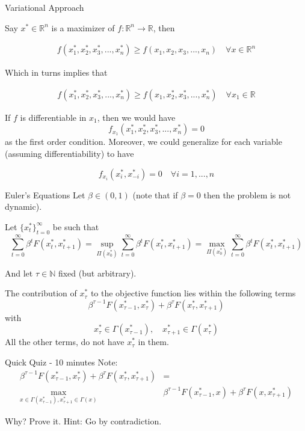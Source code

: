 \documentclass[aspectratio=169]{beamer}
\begin{document}
\begin{frame}{Variational Approach}
    
    Say $x^*\in\mathds{R}^n$ is a maximizer of $f:\mathds{R}^n \rightarrow \mathds{R}$, then
    
        \begin{align*}
            f(x_1^*,x_2^*,x_3^*,...,x_n^*)\geq f(x_1,x_2,x_3,..., x_n)\quad\forall x\in\mathds{R}^n
        \end{align*}
    
    Which in turns implies that
    
    \begin{align*}
            f(x_1^*,x_2^*,x_3^*,...,x_n^*)\geq f(x_1,x_2^*,x_3^*,...,x_n^*)\quad\forall x_1\in\mathds{R}
        \end{align*}
    
    If $f$ is differentiable in $x_1$, then we would have $$f_{x_1}(x_1^*,x_2^*,x_3^*,...,x_n^*) = 0$$ as the first order condition. Moreover, we could generalize for each variable (assuming differentiability) to have
    
    $$f_{x_i}(x_i^*,x_{-i}^*)=0\quad \forall i = 1, ... , n$$
    
\end{frame}

\begin{frame}{Euler's Equations}
    Let $\beta\in(0,1)$ (note that if $\beta=0$ then the problem is not dynamic).
    
    \vspace{0.5cm}
    
    Let $\{x_t^*\}_{t=0}^\infty$ be such that $$\sum_{t=0}^\infty \beta^t F(x_t^*,x_{t+1}^*) = \sup_{\Pi(x_0^*)} \sum_{t=0}^\infty \beta^t F(x_t^*,x_{t+1}^*) = \max_{\Pi(x_0^*)} \sum_{t=0}^\infty \beta^t F(x_t^*,x_{t+1}^*)$$
    
    And let $\tau\in\mathds{N}$ fixed (but arbitrary).
\end{frame}

\begin{frame}
    The contribution of $x_{\tau}^*$ to the objective function lies within the following terms
    $$\beta^{\tau-1} F(x_{\tau-1}^*,x_{\tau}^*) + \beta^\tau F(x_\tau^*,x_{\tau+1}^*)$$
    with
    $$x_\tau^*\in\Gamma(x_{\tau-1}^*),\quad x_{\tau+1}^*\in\Gamma(x_{\tau}^*)$$
    All the other terms, do not have $x_\tau^*$ in them.
\end{frame}

\begin{frame}{Quick Quiz - 10 minutes}
    Note:
    \begin{align*}
        \beta^{\tau-1} F(x_{\tau-1}^*,x_{\tau}^*) + \beta^\tau F(x_\tau^*,x_{\tau+1}^*) &= \\
        \max_{x\in\Gamma(x_{\tau-1}^*),x_{\tau+1}^*\in\Gamma(x)} &\beta^{\tau-1} F(x_{\tau-1}^*,x) + \beta^\tau F(x,x_{\tau+1}^*)
    \end{align*}
    
    Why? Prove it. Hint: Go by contradiction.
\end{frame}
\end{document}
